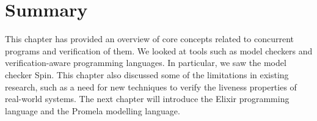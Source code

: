 \section{Summary}
This chapter has provided an overview of core concepts related to concurrent programs and verification of them. We looked at tools such as model checkers and verification-aware programming languages. In particular, we saw the model checker Spin. This chapter also discussed some of the limitations in existing research, such as a need for new techniques to verify the liveness properties of real-world systems. The next chapter will introduce the Elixir programming language and the Promela modelling language.

